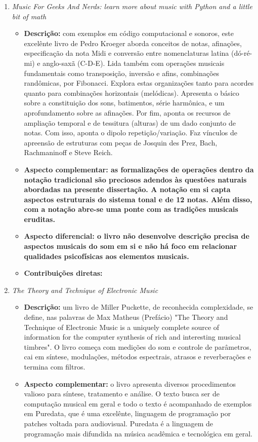 \begin{enumerate}
    \item \emph{Music For Geeks And Nerds: learn more about music with Python and a little bit of math}
        \begin{itemize}
            \item {\bf Descrição:} com exemplos em código computacional e sonoros, este excelênte livro de Pedro Kroeger aborda conceitos de notas, afinações, especificação da nota Midi e conversão entre nomenclaturas latina (dó-ré-mi) e anglo-saxã (C-D-E). Lida também com operações musicais fundamentais como transposição, inversão e afins, combinações randômicas, por Fibonacci. Explora estas organizações tanto para acordes quanto para combinações horizontais (melódicas). Apresenta o básico sobre a constituição dos sons, batimentos, série harmônica, e um aprofundamento sobre as afinações. Por fim, aponta os recursos de ampliação temporal e de tessitura (alturas) de um dado conjunto de notas. Com isso, aponta o dipolo repetição/variação. Faz vínculos de apreensão de estruturas com peças de Josquin des Prez, Bach, Rachmaninoff e Steve Reich.
            \item {\bf Aspecto complementar: as formalizações de operações dentro da notação tradicional são preciosos adendos às questões naturais abordadas na presente dissertação. A notação em si capta aspectos estruturais do sistema tonal e de 12 notas. Além disso, com a notação abre-se uma ponte com as tradições musicais eruditas.}
            \item {\bf Aspecto diferencial: o livro não desenvolve descrição precisa de aspectos musicais do som em si e não há foco em relacionar qualidades psicofísicas aos elementos musicais.}
            \item {\bf Contribuições diretas:}
        \end{itemize}
    \item  \emph{The Theory and Technique of Electronic Music}
        \begin{itemize}
            \item {\bf Descrição:} um livro de Miller Puckette, de reconhecida complexidade, se define, nas palavras de Max Matheus (Prefácio) "The Theory and Technique of Electronic Music is a uniquely complete source of information for the computer synthesis of rich and interesting musical timbres". O livro começa com medições do som e controle de parâmetros, cai em síntese, modulações, métodos espectrais, atrasos e reverberações e termina com filtros.
            \item {\bf Aspecto complementar:} o livro apresenta diversos procedimentos valioso para síntese, tratamento e análise. O texto busca ser de computação musical em geral e todo o texto é acompanhado de exemplos em Puredata, que é uma excelênte, linguagem de programação por patches voltada para audiovisual. Puredata é a linguagem de programação mais difundida na música acadêmica e tecnológica em geral.

\end{itemize}
\end{enumerate}

